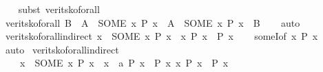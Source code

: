 \begin{isabellebody}
%
\isadelimproof
\ \ %
\endisadelimproof
%
\isatagproof
{}\isamarkupfalse%
\ {\isacharparenleft}{\kern0pt}subst\ verit{\isacharunderscore}{\kern0pt}sko{\isacharunderscore}{\kern0pt}forall{\isacharparenright}{\kern0pt}%
\endisatagproof
{\isafoldproof}%
%
\isadelimproof
\isanewline
%
\endisadelimproof
\isanewline
{}\isamarkupfalse%
\ verit{\isacharunderscore}{\kern0pt}sko{\isacharunderscore}{\kern0pt}forall{\isacharprime}{\kern0pt}{\isacharprime}{\kern0pt}{\isacharcolon}{\kern0pt}\ {\isacartoucheopen}B\ {\isacharequal}{\kern0pt}\ A\ {\isasymLongrightarrow}\ {\isacharparenleft}{\kern0pt}SOME\ x{\isachardot}{\kern0pt}\ P\ x{\isacharparenright}{\kern0pt}\ {\isacharequal}{\kern0pt}\ A\ {\isasymequiv}\ {\isacharparenleft}{\kern0pt}SOME\ x{\isachardot}{\kern0pt}\ P\ x{\isacharparenright}{\kern0pt}\ {\isacharequal}{\kern0pt}\ B{\isacartoucheclose}\isanewline
%
\isadelimproof
\ \ %
\endisadelimproof
%
\isatagproof
{}\isamarkupfalse%
\ auto%
\endisatagproof
{\isafoldproof}%
%
\isadelimproof
\isanewline
%
\endisadelimproof
\isanewline
{}\isamarkupfalse%
\ verit{\isacharunderscore}{\kern0pt}sko{\isacharunderscore}{\kern0pt}forall{\isacharunderscore}{\kern0pt}indirect{\isacharcolon}{\kern0pt}\ {\isacartoucheopen}x\ {\isacharequal}{\kern0pt}\ {\isacharparenleft}{\kern0pt}SOME\ x{\isachardot}{\kern0pt}\ {\isasymnot}P\ x{\isacharparenright}{\kern0pt}\ {\isasymLongrightarrow}\ {\isacharparenleft}{\kern0pt}{\isasymforall}x{\isachardot}{\kern0pt}\ P\ x{\isacharparenright}{\kern0pt}\ {\isasymlongleftrightarrow}\ P\ x{\isacartoucheclose}\isanewline
%
\isadelimproof
\ \ %
\endisadelimproof
%
\isatagproof
{}\isamarkupfalse%
\ someI{\isacharbrackleft}{\kern0pt}of\ {\isacartoucheopen}{\isasymlambda}x{\isachardot}{\kern0pt}\ {\isasymnot}P\ x{\isacartoucheclose}{\isacharbrackright}{\kern0pt}\isanewline
\ \ \isamarkupfalse%
\ auto%
\endisatagproof
{\isafoldproof}%
%
\isadelimproof
\isanewline
%
\endisadelimproof
\isanewline
{}\isamarkupfalse%
\ verit{\isacharunderscore}{\kern0pt}sko{\isacharunderscore}{\kern0pt}forall{\isacharunderscore}{\kern0pt}indirect{}{\isacharcolon}{\kern0pt}\isanewline
\ \ \ \ {\isacartoucheopen}x\ {\isacharequal}{\kern0pt}\ {\isacharparenleft}{\kern0pt}SOME\ x{\isachardot}{\kern0pt}\ {\isasymnot}P\ x{\isacharparenright}{\kern0pt}\ {\isasymLongrightarrow}\ {\isacharparenleft}{\kern0pt}{\isasymAnd}x\ {\isacharcolon}{\kern0pt}{\isacharcolon}{\kern0pt}\ {\isacharprime}{\kern0pt}a{\isachardot}{\kern0pt}\ {\isacharparenleft}{\kern0pt}P\ x\ {\isacharequal}{\kern0pt}\ P{\isacharprime}{\kern0pt}\ x{\isacharparenright}{\kern0pt}{\isacharparenright}{\kern0pt}\ {\isasymLongrightarrow}{\isacharparenleft}{\kern0pt}{\isasymforall}x{\isachardot}{\kern0pt}\ P{\isacharprime}{\kern0pt}\ x{\isacharparenright}{\kern0pt}\ {\isasymlongleftrightarrow}\ P\ x{\isacartoucheclose}\isanewline

\end{isabellebody}
